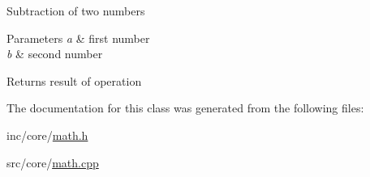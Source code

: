 Subtraction of two numbers 
\begin{DoxyParams}{Parameters}
{\em a} & first number \\
\hline
{\em b} & second number \\
\hline
\end{DoxyParams}
\begin{DoxyReturn}{Returns}
result of operation 
\end{DoxyReturn}


The documentation for this class was generated from the following files\-:\begin{DoxyCompactItemize}
\item 
inc/core/\hyperlink{math_8h}{math.\-h}\item 
src/core/\hyperlink{math_8cpp}{math.\-cpp}\end{DoxyCompactItemize}
